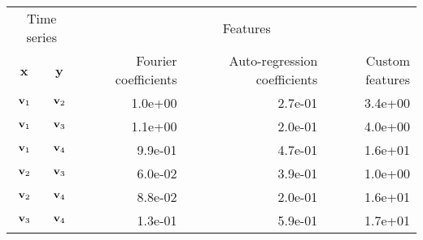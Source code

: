 \begin{tabular}{ccrrr}
    \toprule
    \multicolumn{2}{c}{Time series} & \multicolumn{3}{c}{Features} \\
    \textbf{x} & \textbf{y} & Fourier coefficients & Auto-regression coefficients & Custom features \\ \otoprule
    $\textbf{v}_{1}$ & $\textbf{v}_{2}$ & 1.0e+00 & 2.7e-01 & 3.4e+00 \\
    $\textbf{v}_{1}$ & $\textbf{v}_{3}$ & 1.1e+00 & 2.0e-01 & 4.0e+00 \\
    $\textbf{v}_{1}$ & $\textbf{v}_{4}$ & 9.9e-01 & 4.7e-01 & 1.6e+01 \\
    $\textbf{v}_{2}$ & $\textbf{v}_{3}$ & 6.0e-02 & 3.9e-01 & 1.0e+00 \\
    $\textbf{v}_{2}$ & $\textbf{v}_{4}$ & 8.8e-02 & 2.0e-01 & 1.6e+01 \\
    $\textbf{v}_{3}$ & $\textbf{v}_{4}$ & 1.3e-01 & 5.9e-01 & 1.7e+01 \\
    \bottomrule
\end{tabular}
